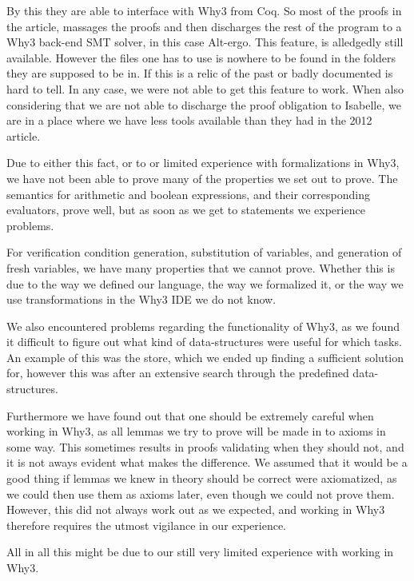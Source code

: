 By this they are able to interface with Why3 from Coq.
So most of the proofs in the article, massages the proofs and then discharges the rest of the program to a Why3 back-end SMT solver, in this case Alt-ergo.
This feature, is alledgedly still available\cite{why3manualold}. However the files one has to use is nowhere to be found in the folders they are supposed to be in.
If this is a relic of the past or badly documented is hard to tell. In any case, we were not able to get this feature to work.
When also considering that we are not able to discharge the proof obligation to Isabelle, we are in a place where we have less tools available than they had in the 2012 article.

Due to either this fact, or to or limited experience with formalizations in Why3, we have not been able to prove many of the properties we set out to prove.
The semantics for arithmetic and boolean expressions, and their corresponding evaluators, prove well, but as
soon as we get to statements we experience problems.

For verification condition generation, substitution of variables, and generation of fresh variables, we have many properties that we cannot prove. Whether this is due to the way we defined our language, the way we formalized it, or the way we use transformations in the Why3 IDE we do not know.

We also encountered problems regarding the functionality of Why3, as we found it difficult to figure out
what kind of data-structures were useful for which tasks. An example of this was the store, which we ended
up finding a sufficient solution for, however this was after an extensive search through the predefined data-structures.

Furthermore we have found out that one should be extremely careful when working in Why3, as all lemmas we
try to prove will be made in to axioms in some way.
This sometimes results in proofs validating when they should not, and it is not aways evident what makes the difference.
We assumed that it would be a good thing if lemmas we knew in theory should be correct were axiomatized, as we
could then use them as axioms later, even though we could not prove them.
However, this did not always work out as we
expected, and working in Why3 therefore requires the utmost vigilance in our experience.

All in all this might be due to our still very limited experience with working in Why3.


